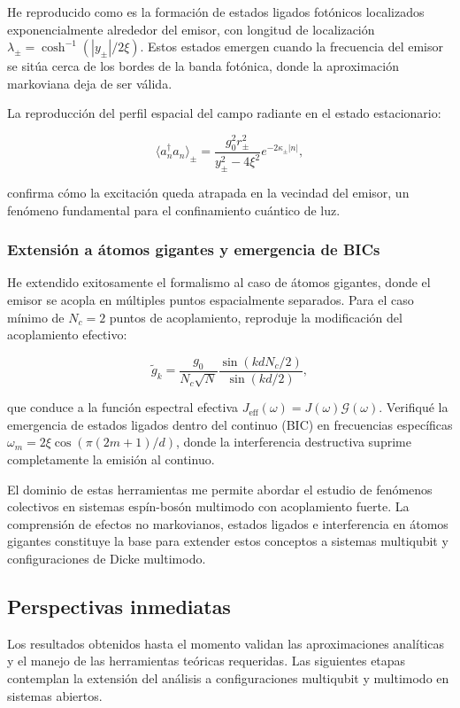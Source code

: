\documentclass[onecolumn,notitlepage,letterpaper,aps,pra,12pt]{article}
\numberwithin{equation}{section}
\begin{document}
He reproducido como es la formación de estados ligados fotónicos localizados exponencialmente alrededor del emisor, con longitud de localización $\lambda_{\pm} = \cosh^{-1} (|y_{\pm}|/2\xi)$. Estos estados emergen cuando la frecuencia del emisor se sitúa cerca de los bordes de la banda fotónica, donde la aproximación markoviana deja de ser válida. 

La reproducción del perfil espacial del campo radiante en el estado estacionario:

\[\langle a_n^{\dagger}a_n \rangle_{\pm} = \frac{g_0^2 r_{\pm}^2}{y_{\pm}^2 - 4\xi^2} e^{-2\kappa_{\pm}|n|},\]

confirma cómo la excitación queda atrapada en la vecindad del emisor, un fenómeno fundamental para el confinamiento cuántico de luz.

\subsubsection{Extensión a átomos gigantes y emergencia de BICs}

He extendido exitosamente el formalismo al caso de átomos gigantes, donde el emisor se acopla en múltiples puntos espacialmente separados. Para el caso mínimo de $N_c=2$ puntos de acoplamiento, reproduje la modificación del acoplamiento efectivo:

\[\tilde{g}_k = \frac{g_0}{N_c\sqrt{N}} \frac{\sin(kdN_c/2)}{\sin(kd/2)},\]

que conduce a la función espectral efectiva $J_{\text{eff}}(\omega) = J(\omega) \mathcal{G}(\omega)$. Verifiqué la emergencia de estados ligados dentro del continuo (BIC) en frecuencias específicas $\omega_m = 2\xi\cos(\pi(2m+1)/d)$, donde la interferencia destructiva suprime completamente la emisión al continuo.



El dominio de estas herramientas me permite abordar el estudio de fenómenos colectivos en sistemas espín-bosón multimodo con acoplamiento fuerte. La comprensión de efectos no markovianos, estados ligados e interferencia en átomos gigantes constituye la base para extender estos conceptos a sistemas multiqubit y configuraciones de Dicke multimodo.

\subsection{Perspectivas inmediatas}

Los resultados obtenidos hasta el momento validan las aproximaciones analíticas y el manejo de las herramientas teóricas requeridas. Las siguientes etapas contemplan la extensión del análisis a configuraciones multiqubit y multimodo en sistemas abiertos. 
\end{document}
